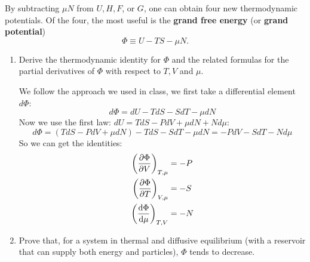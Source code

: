 \documentclass[10pt]{article}
\begin{document}
	By subtracting $\mu N$ from $U, H, F$, or $G$, one can obtain four new thermodynamic potentials. Of the 
	four, the most useful is the \textbf{grand free energy} (or \textbf{grand potential})
	\[
		\Phi \equiv U - TS - \mu N
	.\]
	\begin{enumerate}[label=\alph*)]
		\item Derive the thermodynamic identity for $\Phi$ and the related formulas for the partial 
			derivatives of $\Phi$ with respect to $T, V$ and $\mu$.

			\begin{solution}
				We follow the approach we used in class, we first take a differential element $d \Phi$:
				\[
				d\Phi = dU - T dS - S dT - \mu dN 
				\] 
				Now we use the first law: $dU = T dS - PdV + \mu dN + N d \mu$:
				\[
				d\Phi = (T dS - PdV + \mu dN) - T dS - S dT - \mu dN = -PdV - SdT - N d \mu
				\]
				So we can get the identities:
				\begin{align*}
					\left( \pdv{\Phi}{V} \right)_{T,\mu} &= -P\\
					\left( \pdv{\Phi}{T} \right)_{V, \mu} &= -S\\
					\left( \dv{\Phi}{\mu} \right)_{T, V} &= -N
				\end{align*}
			\end{solution}
		\item Prove that, for a system in thermal and diffusive equilibrium (with a reservoir that can 
			supply both energy and particles), $\Phi$ tends to decrease. 


\end{enumerate}
\end{document}
